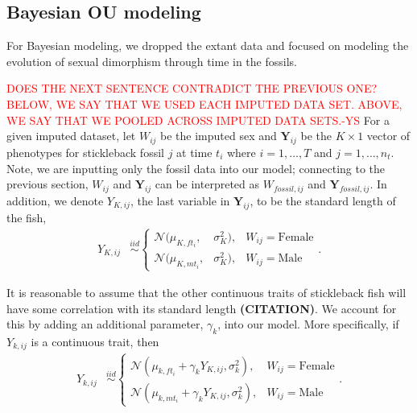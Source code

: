 \documentclass[
  12pt,
]{article}
\begin{document}
\hypertarget{bayesian-ou-modeling}{%
\subsection{Bayesian OU modeling}\label{bayesian-ou-modeling}}

For Bayesian modeling, we dropped the extant data and focused on
modeling the evolution of sexual dimorphism through time in the fossils.

\textcolor{red}{DOES THE NEXT SENTENCE CONTRADICT THE PREVIOUS ONE? BELOW, WE SAY THAT WE USED EACH IMPUTED DATA SET. ABOVE, WE SAY THAT WE POOLED ACROSS IMPUTED DATA SETS.-YS}
For a given imputed dataset, let \(W_{ij}\) be the imputed sex and
\(\boldsymbol{Y}_{ij}\) be the \(K \times 1\) vector of phenotypes for
stickleback fossil \(j\) at time \(t_i\) where \(i = 1, \ldots, T\) and
\(j = 1,\ldots,n_{t}\). Note, we are inputting only the fossil data into
our model; connecting to the previous section, \(W_{ij}\) and
\(\boldsymbol{Y}_{ij}\) can be interpreted as \(W_{fossil,ij}\) and
\(\boldsymbol{Y}_{fossil,ij}\). In addition, we denote \(Y_{K,ij}\), the
last variable in \(\boldsymbol{Y}_{ij}\), to be the standard length of
the fish, \begin{align}
{Y}_{K,ij} & \overset{iid}{\sim}\left\{\begin{array}{lll} \mathcal{N}(\mu_{K,ft_i},&\sigma_{K}^2), & W_{ij} = \text{Female} \\ \mathcal{N}(\mu_{K,mt_i},&\sigma_{K}^2), & W_{ij} = \text{Male} \end{array}\right..
\label{eq:stl}
\end{align}

It is reasonable to assume that the other continuous traits of
stickleback fish will have some correlation with its standard length
\textbf{(CITATION)}. We account for this by adding an additional
parameter, \(\gamma_k\), into our model. More specifically, if
\(Y_{k,ij}\) is a continuous trait, then \begin{align}
{Y}_{k,ij} & \overset{iid}{\sim}\left\{\begin{array}{llll} \mathcal{N}(\mu_{k,ft_i} + \gamma_kY_{K,ij},\sigma_k^2), & W_{ij} = \text{Female} \\ \mathcal{N}(\mu_{k,mt_i} + \gamma_kY_{K,ij},\sigma_k^2), & W_{ij} = \text{Male} \end{array}\right..
\label{eq:cont}
\end{align}
\end{document}
